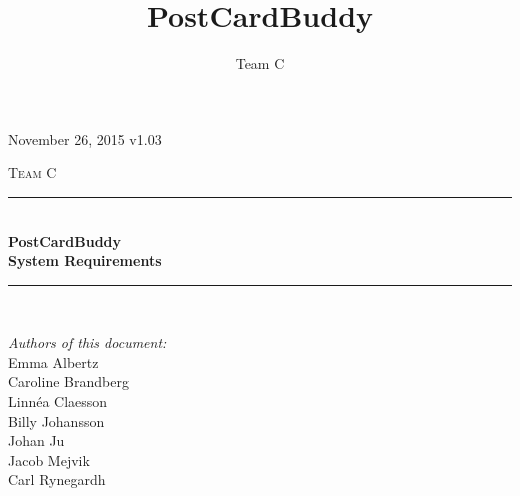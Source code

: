 \documentclass[10pt,a4paper]{article}
\title{PostCardBuddy}
\author{Team C}
\begin{document}
\begin{titlepage}
\newcommand{\HRule}{\rule{\linewidth}{0.5mm}}


\begin{flushright}
November 26, 2015 v1.03\\[3cm]
\end{flushright}


\centering
\textsc{\LARGE Team C}\\[0.5cm]

\HRule \\[0.4cm]
{ \huge \bfseries PostCardBuddy}\\[0.3cm]
{\Large \bfseries System Requirements}\\[0.4cm] %
\HRule \\[1.5cm]

\vfill
\begin{flushleft}
\textit{Authors of this document:}\\
Emma Albertz\\
Caroline Brandberg\\
Linnéa Claesson\\
Billy Johansson\\
Johan Ju\\
Jacob Mejvik\\
Carl Rynegardh
\end{flushleft}

\end{titlepage}



%



\setcounter{tocdepth}{2}
\tableofcontents
\newpage
{}

\end{document}
